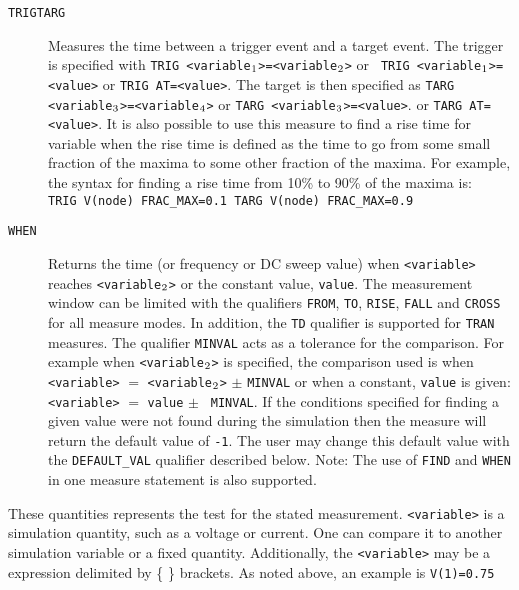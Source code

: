 \begin{Command}
\begin{Arguments}
\begin{description}
  \item[\vbox{\hbox{\tt TRIG\hfil}\hbox{\tt TARG\hfil}}] Measures the
    time between a trigger event and a target event.  The trigger is
    specified with {\tt TRIG <variable\(\sb{1}\)>=<variable\(\sb{2}\)>} or {\tt
    TRIG <variable\(\sb{1}\)>=<value>} or {\tt TRIG AT=<value>}.  The
    target is then specified as {\tt TARG
    <variable\(\sb{3}\)>=<variable\(\sb{4}\)>} or {\tt TARG <variable\(\sb{3}\)>=<value>}.
    or {\tt TARG AT=<value>}.  It is also possible to use this
    measure to find a rise time for variable when the rise time is
    defined as the time to go from some small fraction of the maxima
    to some other fraction of the maxima.  For example, the syntax for
    finding a rise time from 10\% to 90\% of the maxima
    is:\\ \texttt{TRIG V(node) FRAC\_MAX=0.1 TARG V(node)
    FRAC\_MAX=0.9}

  \item[\tt WHEN] Returns the time (or frequency or DC sweep value) when
    {\tt <variable>} reaches {\tt <variable\(\sb{2}\)>} or the constant
    value, {\tt value}.  The measurement window can be limited with the
    qualifiers {\tt FROM}, {\tt TO}, {\tt RISE}, {\tt FALL} and {\tt CROSS}
    for all measure modes.  In addition, the {\tt TD} qualifier is supported
    for {\tt TRAN} measures. The qualifier {\tt MINVAL} acts as a
    tolerance for the comparison.  For example when {\tt <variable\(\sb{2}\)>}
    is specified, the comparison used is when {\tt <variable>} $=$
    {\tt <variable\(\sb{2}\)>} $\pm$ {\tt MINVAL} or when a constant,
    {\tt value} is given: {\tt <variable>} $=$ {\tt value} $\pm$ {\tt
    MINVAL}.  If the conditions specified for finding a given value
    were not found during the simulation then the measure will return
    the default value of {\tt -1}.  The user may change this default
    value with the {\tt DEFAULT\_VAL} qualifier described below.
    Note: The use of {\tt FIND} and {\tt WHEN} in one measure
    statement is also supported.
\end{description}


These quantities represents the test for the stated
measurement.  \texttt{<variable>} is a simulation quantity, such as a
voltage or current.  One can compare it to another simulation variable
or a fixed quantity.  Additionally, the \texttt{<variable>} may be
a \Xyce{} expression delimited by \{ \} brackets.  As noted above, an
example is {\tt V(1)=0.75}


\end{Arguments}
\end{Command}
